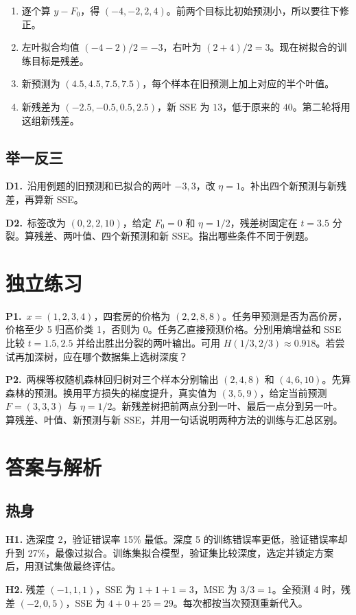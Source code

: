 \documentclass[UTF8,a4paper,11pt]{ctexart}
\newcommand{\PracticeQuestion}[3]{\par\Needspace{4\baselineskip}\noindent\begin{minipage}{\linewidth}\textbf{#1.}\ #2\par\noindent\rule{0pt}{#3mm}\par\end{minipage}\par}
\begin{document}
\begin{enumerate}
\item 逐个算 $y-F_0$，得 $(-4,-2,2,4)$。前两个目标比初始预测小，所以要往下修正。
\item 左叶拟合均值 $(-4-2)/2=-3$，右叶为 $(2+4)/2=3$。现在树拟合的训练目标是残差。
\item 新预测为 $(4.5,4.5,7.5,7.5)$，每个样本在旧预测上加上对应的半个叶值。
\item 新残差为 $(-2.5,-0.5,0.5,2.5)$，新 SSE 为 $13$，低于原来的 $40$。第二轮将用这组新残差。
\end{enumerate}
\subsection{举一反三}
\PracticeQuestion{D1}{沿用例题的旧预测和已拟合的两叶 $-3,3$，改 $\eta=1$。补出四个新预测与新残差，再算新 SSE。}{32}
\PracticeQuestion{D2}{标签改为 $(0,2,2,10)$，给定 $F_0=0$ 和 $\eta=1/2$，残差树固定在 $t=3.5$ 分裂。算残差、两叶值、四个新预测和新 SSE。指出哪些条件不同于例题。}{40}
\clearpage
\section{独立练习}
\PracticeQuestion{P1}{$x=(1,2,3,4)$，四套房的价格为 $(2,2,8,8)$。任务甲预测是否为高价房，价格至少 5 归高价类 1，否则为 0。任务乙直接预测价格。分别用熵增益和 SSE 比较 $t=1.5,2.5$ 并给出胜出分裂的两叶输出。可用 $H(1/3,2/3)\approx0.918$。若尝试再加深树，应在哪个数据集上选树深度？}{64}
\PracticeQuestion{P2}{两棵等权随机森林回归树对三个样本分别输出 $(2,4,8)$ 和 $(4,6,10)$。先算森林的预测。换用平方损失的梯度提升，真实值为 $(3,5,9)$，给定当前预测 $F=(3,3,3)$ 与 $\eta=1/2$。新残差树把前两点分到一叶、最后一点分到另一叶。算残差、叶值、新预测与新 SSE，并用一句话说明两种方法的训练与汇总区别。}{54}
\clearpage
\section{答案与解析}
\subsection{热身}
\textbf{H1.} 选深度 2，验证错误率 15\% 最低。深度 5 的训练错误率更低，验证错误率却升到 27\%，最像过拟合。训练集拟合模型，验证集比较深度，选定并锁定方案后，用测试集做最终评估。

\textbf{H2.} 残差 $(-1,1,1)$，SSE 为 $1+1+1=3$，MSE 为 $3/3=1$。全预测 4 时，残差 $(-2,0,5)$，SSE 为 $4+0+25=29$。每次都按当次预测重新代入。
\end{document}
